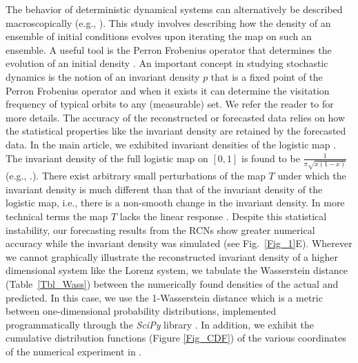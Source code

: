 \documentclass[12 pt]{article}
\begin{document}
The behavior of deterministic dynamical systems can alternatively be described macroscopically (e.g., \cite{lasota2013chaos}). This study involves describing how the density of an ensemble of initial conditions evolves upon iterating the map on such an ensemble.  A useful tool is the Perron Frobenius operator that determines the evolution of an initial density \cite{lasota2013chaos}.  An important concept in studying stochastic dynamics is the notion of an invariant density $p$ that is a fixed point of the Perron Frobenius operator and when it exists it can determine the visitation frequency of typical orbits to any (measurable) set.   We refer the reader to \cite{lasota2013chaos} for more details.
The accuracy of the reconstructed or forecasted data relies on how the statistical properties like the invariant density  are retained by the forecasted data.  In the main article, we exhibited invariant densities of the logistic map \cite[Fig.~\ref{Fig_1}]{Main_article}. The invariant density of the full logistic map  on $[0,1]$ is found to be $\frac{1}{\pi\sqrt{x(1-x)}}$ (e.g., \cite{lasota2013chaos}.). There exist arbitrary small perturbations of the map $T$ under which the invariant density is much different than that of the invariant density of the logistic map, i.e., there is a non-smooth change in the invariant density. In more technical terms the map $T$ lacks the linear response \cite{baladi2014linear}. Despite this statistical instability, our forecasting results from the RCNs show greater numerical accuracy while the invariant density was simulated (see Fig.~\ref{Fig_1}E). Wherever we cannot graphically illustrate the reconstructed invariant density of a higher dimensional system like the Lorenz system, we tabulate the Wasserstein distance (Table~\ref{Tbl_Wass}) 
between the numerically found densities of the actual and predicted. In this case, we use the 1-Wasserstein distance \cite{dobrushin1970prescribing} which is a metric between one-dimensional probability distributions, implemented programmatically through the {\it SciPy } library \cite{2020SciPy-NMeth}. In addition, we exhibit the cumulative distribution functions (Figure \ref{Fig_CDF}) of the various coordinates of the numerical experiment in  \cite[Fig.~\ref{Fig_1}B]{Main_article}. 
\end{document}
